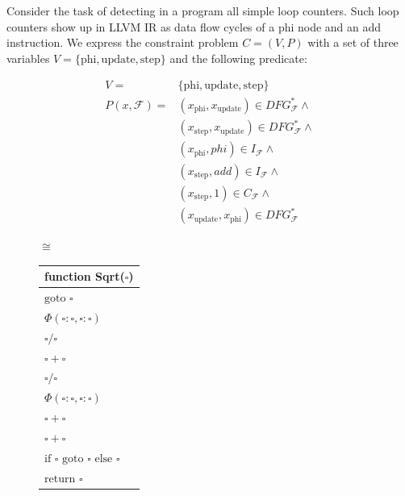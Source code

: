     Consider the task of detecting in a program all simple loop counters.
    Such loop counters show up in LLVM IR as data flow cycles of a phi node
    and an add instruction.
    We express the constraint problem $C=(V,P)$ with a set of three variables
    $V=\{\text{phi}, \text{update}, \text{step}\}$ and the following predicate:

\begin{figure}
\begin{minipage}{0.4\textwidth}
    \begin{align*}
        V=&\{\text{phi}, \text{update}, \text{step}\}\\
        P(x,\mathcal F)=&(x_\text{phi},x_\text{update})\in DFG_\mathcal{F}^*\land\\
                        &(x_\text{step},x_\text{update})\in DFG_\mathcal{F}^*\land\\
                        &(x_\text{phi}, phi)\in I_\mathcal{F}\land\\
                        &(x_\text{step}, add)\in I_\mathcal{F}\land\\
                        &(x_\text{step},1)\in C_\mathcal{F}\land\\
                        &(x_\text{update},x_\text{phi})\in DFG_\mathcal{F}^*
    \end{align*}
\end{minipage}
\begin{minipage}{0.04\textwidth}
\centering
$\cong$
\end{minipage}
\begin{minipage}{0.22\textwidth}
\begin{tabular}{|l|}
\multicolumn{1}{c}{{\bf function} Sqrt($\square$)}\\
\hline
$\text{goto } \square$\\
$\Phi(\square:\square,\square:\square)$\\
$\square/\square$\\
$\square+\square$\\
$\square/\square$\\
$\Phi(\square:\square,\square:\square)$\\
$\square+\square$\\
$\square+\square$\\
$\text{if }\square\text{ goto }\square\text{ else }\square$\\
$\text{return }\square$\\
\hline
\end{tabular}
\end{minipage}

\end{figure}
